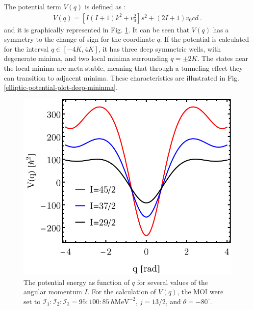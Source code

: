 The potential term $V(q)$ is defined as \cite{raduta2020new}:
\begin{align}
    V(q)=\left[I(I+1)k^2+v_0^2\right]s^2+\left(2I+1\right)v_0cd\ .
    \label{elliptic-potential-formula}
\end{align}
and it is graphically represented in Fig. \ref{elliptic-potential-plot}. It can be seen that $V(q)$ has a symmetry to the change of sign for the coordinate $q$. If the potential is calculated for the interval $q\in\left[-4K,4K\right]$, it has three deep symmetric wells, with degenerate minima, and two local minima surrounding $q=\pm 2K$. The states near the local minima are meta-stable, meaning that through a tunneling effect they can transition to adjacent minima. These characteristics are illustrated in Fig. \ref{elliptic-potential-plot-deep-mininma}.
\begin{figure}
    \centering
    \includegraphics[scale=0.85]{Chapters/Figures/Elliptic-Potential-V.pdf}
    \caption{The potential energy as function of $q$ for several values of the angular momentum $I$. For the calculation of $V(q)$, the MOI were set to $\mathcal{I}_1:\mathcal{I}_2:\mathcal{I}_3=95:100:85\ \hbar\text{MeV}^{-2}$, $j=13/2$, and $\theta=-80^\circ$.}
    \label{elliptic-potential-plot}
\end{figure}
